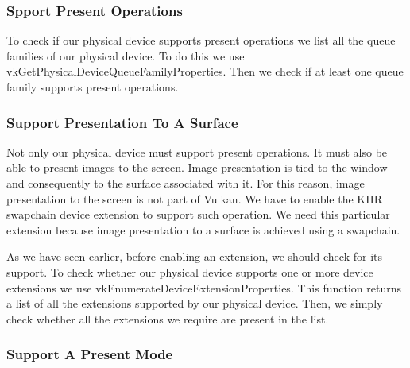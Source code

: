 \subsubsection{Spport Present Operations}

To check if our physical device supports present operations we list all
the queue families of our physical device.
To do this we use vkGetPhysicalDeviceQueueFamilyProperties.
Then we check if at least one queue family supports present operations.

\begin{minipage}{\linewidth}{\noindent}
    
\end{minipage}

\subsubsection{Support Presentation To A Surface}

Not only our physical device must support present operations.
It must also be able to present images to the screen.
Image presentation is tied to the window and consequently to the surface
associated with it.
For this reason, image presentation to the screen is not part of Vulkan.
We have to enable the KHR swapchain device extension to support such operation.
We need this particular extension because image presentation to a surface is
achieved using a swapchain.

\begin{minipage}{\linewidth}{\noindent}
    
\end{minipage}

As we have seen earlier, before enabling an extension, we should check for its
support.
To check whether our physical device supports one or more device extensions we use
vkEnumerateDeviceExtensionProperties.
This function returns a list of all the extensions supported by our physical device.
Then, we simply check whether all the extensions we require are present in the list.

\subsubsection{Support A Present Mode}

